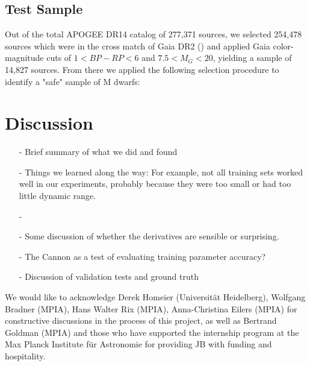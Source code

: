 \documentclass[modern]{aastex62}
\begin{document}
\subsection{Test Sample}
Out of the total APOGEE DR14 catalog of 277,371 sources, we selected 254,478 sources which were in the cross match of Gaia DR2 (\citealt{Brown:2018}) and applied Gaia color-magnitude cuts of $1<BP-RP<6$ and $7.5<M_G<20$, yielding a sample of 14,827 sources. From there we applied the following selection procedure to identify a "safe" sample of M dwarfs:


\section{Discussion} \label{sec:discussion}

\begin{enumerate}
\item[-] Brief summary of what we did and found

\item[-] Things we learned along the way: For example, not all training sets worked well in our experiments, probably because they were too small or had too little dynamic range.

\item[-] \color{gcolor}{HOGG: Some discussion of precision and accuracy: The Cannon can produce precise results, but is only as accurate as its training set.}\color{black}

\item[-] Some discussion of whether the derivatives are sensible or surprising. \color{red}{Add derivative plots.}\color{black}

\item[-] The Cannon as a test of evaluating training parameter accuracy? 
\item[-] Discussion of validation tests and ground truth
\end{enumerate}

\acknowledgements
We would like to acknowledge Derek Homeier (Universit{\"a}t Heidelberg), Wolfgang Bradner (MPIA), Hans Walter Rix (MPIA), Anna-Christina Eilers (MPIA) for constructive discussions in the process of this project, as well as Bertrand Goldman (MPIA) and those who have supported the internship program at the Max Planck Institute f{\"u}r Astronomie for providing JB with funding and hospitality. \color{gcolor}{HOGG: SDSS acknowledgments... Grants and stuff...}\color{black}  
\end{document}

